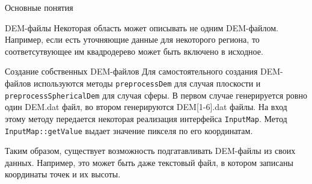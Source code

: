 \documentclass[12pt]{article}
\newcommand{\englishterm}[1]{\textenglish{\texttt{#1}}}
\begin{document}
\begin{section}{Основные понятия}
\begin{subsection}{DEM-файлы}
Некоторая область может описывать не одним DEM-файлом. Например, если есть уточняющие данные для некоторого региона, то соответсутвующее им квадродерево может быть включено в исходное.

\begin{paragraph}{Создание собственных DEM-файлов}
Для самостоятельного создания DEM-файлов используются методы \englishterm{preprocessDem} для случая плоскости и \englishterm{preprocessSphericalDem} для случая сферы. В первом случае генерируется ровно один DEM.dat файл, во втором генерируются DEM[1-6].dat файлы.
На вход этому методу передается некоторая реализация интерфейса \englishterm{InputMap}. Метод \englishterm{InputMap::getValue} выдает значение пикселя по его координатам.

Таким образом, существует возможность подгатавливать DEM-файлы из своих данных. Например, это может быть даже текстовый файл, в котором записаны координаты точек и их высоты.
\end{paragraph}
\end{subsection}
\end{section}
\end{document}
